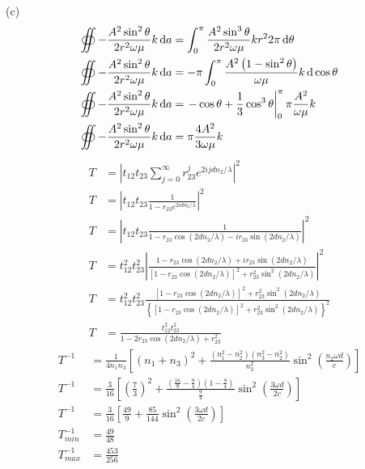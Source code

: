 (c)\begin{align*}
    \oiint-\frac{A^2\sin^2\theta}{2r^2\omega\mu}k\dif a&=\int_{0}^{\pi}\frac{A^2\sin^3\theta}{2r^2\omega\mu}kr^2 2\pi\dif\theta\\
    \oiint-\frac{A^2\sin^2\theta}{2r^2\omega\mu}k\dif a&=-\pi\int_{0}^{\pi}\frac{A^2\left(1-\sin^2\theta\right)}{\omega\mu}k \dif\cos\theta\\
    \oiint-\frac{A^2\sin^2\theta}{2r^2\omega\mu}k\dif a&=\left.
    -\cos\theta+\frac{1}{3}\cos^3\theta\right|_{0}^{\pi}\pi\frac{A^2}{\omega\mu}k\\
    \oiint-\frac{A^2\sin^2\theta}{2r^2\omega\mu}k\dif a&=\pi\frac{4A^2}{3\omega\mu}k
\end{align*}
\begin{align*}
    T&=\left|t_{12}t_{23}\sum_{j=0}^{\infty}r_{23}^je^{2ijdn_2/\lambda}\right|^2\\
    T&=\left|t_{12}t_{23}\frac{1}{1-r_{23}e^{2idn_2/\lambda}}\right|^2\\
    T&=\left|t_{12}t_{23}\frac{1}{1-r_{23}\cos\left(2dn_2/\lambda\right)-ir_{23}\sin\left(2dn_2/\lambda\right)}\right|^2\\
    T&=t_{12}^2t_{23}^2\left|\frac{1-r_{23}\cos\left(2dn_2/\lambda\right)+ir_{23}\sin\left(2dn_2/\lambda\right)}{\left[1-r_{23}\cos\left(2dn_2/\lambda\right)\right]^2+r_{23}^2\sin^2\left(2dn_2/\lambda\right)}\right|^2\\
    T&=t_{12}^2t_{23}^2\frac{\left[1-r_{23}\cos\left(2dn_2/\lambda\right)\right]^2+r_{23}^2\sin^2\left(2dn_2/\lambda\right)}{\left\{\left[1-r_{23}\cos\left(2dn_2/\lambda\right)\right]^2+r_{23}^2\sin^2\left(2dn_2/\lambda\right)\right\}^2}\\
    T&=\frac{t_{12}^2t_{23}^2}{1-2r_{23}\cos\left(2dn_2/\lambda\right)+r_{23}^2}
\end{align*}
\begin{align*}
    T^{-1} &= \frac{1}{4n_1 n_3} \left[ (n_1 + n_3)^2 + \frac{(n_1^2 - n_2^2)(n_3^2 - n_2^2)}{n_2^2}\sin^2\left(\frac{n_2 \omega d}{c}\right) \right]\\
    T^{-1} &= \frac{3}{16 } \left[ \left(\frac{7}{3}\right)^2 + \frac{(\frac{16}{9} - \frac{9}{4})(1 - \frac{9}{4})}{\frac{9}{4}}\sin^2\left(\frac{3\omega d}{2c}\right) \right]\\
    T^{-1} &= \frac{3}{16 } \left[ \frac{49}{9} + \frac{85}{144}\sin^2\left(\frac{3\omega d}{2c}\right) \right]\\
    T^{-1}_{min} &= \frac{49}{48}\\
    T^{-1}_{max} &= \frac{453}{256}
\end{align*}
